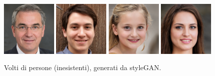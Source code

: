 \documentclass[Lau, noexaminfo, oneside]{sapthesis} %
\begin{document}
\begin{figure}[H]
\includegraphics[width=0.24\textwidth]{1.jpeg}
\includegraphics[width=0.24\textwidth]{2.jpeg}
\includegraphics[width=0.24\textwidth]{3.jpeg}
\includegraphics[width=0.24\textwidth]{4.jpeg}
\centering
\caption{Volti di persone (inesistenti), generati da styleGAN.}
\end{figure}
\end{document}
